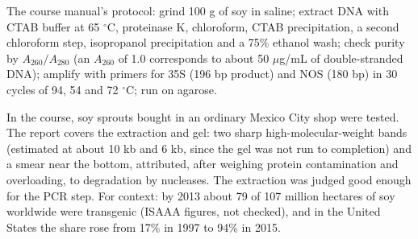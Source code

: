 The course manual's protocol: grind 100 g of
soy in saline; extract DNA with CTAB buffer
at 65 $^\circ$C, proteinase K, chloroform,
CTAB precipitation, a second chloroform step,
isopropanol precipitation and a 75\% ethanol
wash; check purity by $A_{260}/A_{280}$ (an
$A_{260}$ of 1.0 corresponds to about 50
$\mu$g/mL of double-stranded DNA); amplify
with primers for 35S (196 bp product) and NOS
(180 bp) in 30 cycles of 94, 54 and 72
$^\circ$C; run on agarose.

In the course, soy sprouts bought in an
ordinary Mexico City shop were tested.
The report covers the extraction and
gel: two sharp high-molecular-weight bands
(estimated at about 10 kb and 6 kb, since the
gel was not run to completion) and a smear
near the bottom, attributed, after
weighing protein contamination and
overloading, to degradation by nucleases. The
extraction was judged good enough for the PCR
step. For
context: by 2013 about 79 of 107 million
hectares of soy worldwide were transgenic
(ISAAA figures, not checked), and in the
United States the share rose from 17\% in
1997 to 94\% in 2015.





